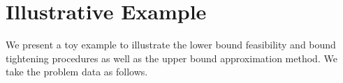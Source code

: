 \section{Illustrative Example} \label{sec:expl}

We present a toy example to illustrate the lower bound feasibility and bound tightening procedures as well as the upper bound approximation method.
We take the problem data as follows.

\medskip
\noindent
{}
%

